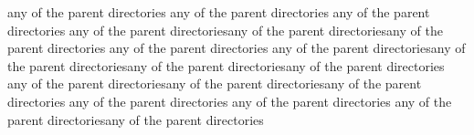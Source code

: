 any of the parent directories
any of the parent directories
any of the parent directories
any of the parent directoriesany of the parent directoriesany of the parent directories
any of the parent directories
any of the parent directoriesany of the parent directoriesany of the parent directoriesany of the parent directories
any of the parent directoriesany of the parent directoriesany of the parent directories
any of the parent directories
any of the parent directories
any of the parent directoriesany of the parent directories
